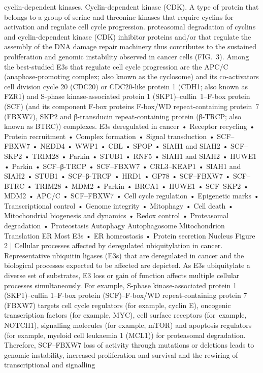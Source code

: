 cyclin-dependent kinases.
Cyclin-dependent kinase
(CDK). A type of protein that
belongs to a group of serine
and threonine kinases that
require cyclins for activation
and regulate cell cycle
progression.
proteasomal degradation of cyclins and cyclin-­dependent
kinase (CDK) inhibitor proteins and/or that regulate the
assembly of the DNA damage repair machinery thus
contributes to the sustained proliferation and genomic
instability observed in cancer cells (FIG. 3). Among the
best-studied E3s that regulate cell cycle progression are
the APC/C (anaphase-promoting complex; also known
as the cyclosome) and its ­co‑activators cell division
cycle 20 (CDC20) or CDC20-like protein 1 (CDH1; also
known as FZR1) and S-phase kinase-­associated protein 1
(SKP1)–cullin 1–F‑box protein (SCF) (and its component
F‑box proteins F‑box/WD repeat-containing protein 7
(FBXW7), SKP2 and ­β-transducin repeat-containing
protein (β-TRCP; also known as BTRC)) complexes.
E3s deregulated
in cancer
• Receptor recycling
• Protein recruitment
• Complex formation
• Signal transduction
• SCF–FBXW7
• NEDD4
• WWP1
• CBL
• SPOP
• SIAH1 and
SIAH2
• SCF–SKP2
• TRIM28
• Parkin
• STUB1
• RNF5
• SIAH1 and
SIAH2
• HUWE1
• Parkin
• SCF–β-TRCP
• SCF–FBXW7
• CRL3–KEAP1
• SIAH1 and
SIAH2
• STUB1
• SCF–β-TRCP
• HRD1
• GP78
• SCF–FBXW7
• SCF–BTRC
• TRIM28
• MDM2
• Parkin
• BRCA1
• HUWE1
• SCF–SKP2
• MDM2
• APC/C
• SCF–FBXW7
• Cell cycle regulation
• Epigenetic marks
• Transcriptional control
• Genome integrity
• Mitophagy
• Cell death
• Mitochondrial
   biogenesis and
   dynamics
• Redox control
• Proteasomal
   degradation
• Proteostasis
Autophagy
Autophagosome
Mitochondrion
Translation
ER
Most E3s
• ER homeostasis
• Protein secretion
Nucleus
Figure 2 | Cellular processes affected by deregulated ubiquitylation in cancer. Representative ubiquitin ligases (E3s)
that are deregulated in cancer and the biological processes expected to be affected are depicted. As E3s ubiquitylate a
diverse set of substrates, E3 loss or gain of function affects multiple cellular processes simultaneously. For example, S-phase
kinase-associated protein 1 (SKP1)–cullin 1–F‑box protein (SCF)–F‑box/WD repeat-containing protein 7 (FBXW7) targets
cell cycle regulators (for example, cyclin E), oncogenic transcription factors (for example, MYC), cell surface receptors
(for example, NOTCH1), signalling molecules (for example, mTOR) and apoptosis regulators (for example, myeloid cell
leukaemia 1 (MCL1)) for proteasomal degradation. Therefore, SCF–FBXW7 loss of activity through mutations or deletions
leads to genomic instability, increased proliferation and survival and the rewiring of transcriptional and signalling
